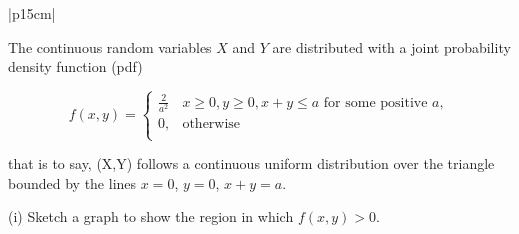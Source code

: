 \documentclass[a4paper,12pt]{article}
\begin{document}
 
 
  \begin{table}[ht!]
     \centering
     \begin{tabular}{|p{15cm}|}
     \hline

\largeThe
\noindent The continuous random variables $X$ and $Y$ are distributed with a joint probability density function (pdf) 
  


\[  f(x,y) = \begin{cases}  \frac{2}{a^2} & x \geq 0, y \geq 0, x + y \leq a \mbox{ for some positive } a,    \\
0,  & \mbox{otherwise} \\ 
  \end{cases}\]

 
 that is to say, (X,Y) follows a continuous uniform distribution over the triangle bounded by the lines $x = 0$,  $y = 0$,  $x+y = a$. 
 
 (i) Sketch a graph to show the region in which $f(x,y) > 0$.         

\\ \hline  
      \end{tabular}
    \end{table}
\end{document}
